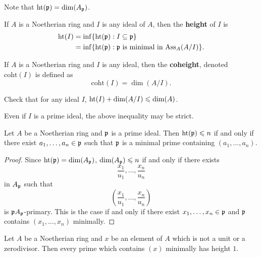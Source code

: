 \documentclass{ximera}
\begin{document}
\begin{remark} Note that $\operatorname{ht}(\mathfrak{p}) = \dim(A_{\mathfrak{p}})$.
\end{remark}

\begin{definition} If $A$ is a Noetherian ring and $I$ is any ideal of $A$, then the \textbf{height} of $I$ is 
\begin{align*}
\operatorname{ht}(I) &= \inf\{\operatorname{ht}(\mathfrak{p}): I\subseteq\mathfrak{p}\} \\
&= \inf\{\operatorname{ht}(\mathfrak{p}): \mathfrak{p} \text{ is minimal in $\operatorname{Ass}_A(A/I)$}\}.
\end{align*}
\end{definition}

\begin{definition} If $A$ is a Noetherian ring and $I$ is any ideal, then the \textbf{coheight}, denoted $\mathrm{coht}(I)$ is defined as 
\[
\mathrm{coht}(I) = \dim(A/I).
\]
\end{definition}

\begin{exercise} Check that for any ideal $I$, $\operatorname{ht}(I)+\dim(A/I)\leqslant\dim(A)$. 
\end{exercise}

\begin{warning}
Even if $I$ is a prime ideal, the above inequality may be strict.
\end{warning}

\begin{corollary}\label{C:KIT} Let $A$ be a Noetherian ring and $\mathfrak{p}$ is a prime ideal.  Then $\operatorname{ht}(\mathfrak{p})\leqslant n$ if and only if there exist $a_1,\dots,a_n\in\mathfrak{p}$ such that $\mathfrak{p}$ is a minimal prime containing $(a_1,\dots,a_n)$.
\end{corollary}

\begin{proof} Since $\operatorname{ht}(\mathfrak{p}) = \dim(A_{\mathfrak{p}})$, $\dim(A_{\mathfrak{p}})\leqslant n$ if and only if there exists 
\[
\frac{x_1}{u_1}, \dots, \frac{x_n}{u_n}
\]
in $A_{\mathfrak{p}}$ such that 
\[
\left(\frac{x_1}{u_1}, \dots, \frac{x_n}{u_n}\right)
\]
is $\mathfrak{p} A_{\mathfrak{p}}$-primary. This is the case if and only if there exist $x_1,\dots, x_n\in \mathfrak{p}$ and $\mathfrak{p}$ contains $(x_1,\dots,x_n)$ minimally. 
\end{proof}


\begin{corollary} Let $A$ be a Noetherian ring and $x$ be an element of $A$ which is not a unit or a zerodivisor. Then every prime which contains $(x)$ minimally has height $1$.
\end{corollary}
\end{document}
